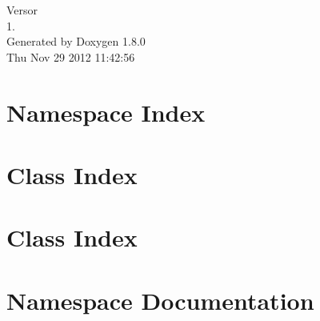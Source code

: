 \documentclass{book}
\begin{document}
\hypersetup{pageanchor=false,citecolor=blue}
\begin{titlepage}
\vspace*{7cm}
\begin{center}
{\Large Versor \\[1ex]\large 1. }\\
\vspace*{1cm}
{\large Generated by Doxygen 1.8.0}\\
\vspace*{0.5cm}
{\small Thu Nov 29 2012 11:42:56}\\
\end{center}
\end{titlepage}
\clearemptydoublepage
{}
\tableofcontents
\clearemptydoublepage
{}
\hypersetup{pageanchor=true,citecolor=blue}
\chapter{Namespace Index}

\chapter{Class Index}

\chapter{Class Index}

\chapter{Namespace Documentation}


\end{document}
